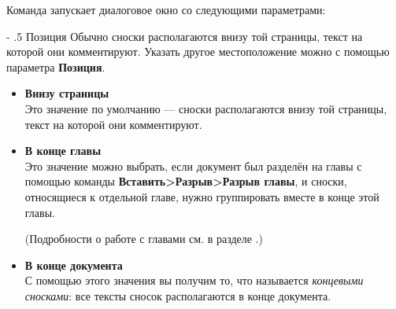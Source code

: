﻿\documentclass[a4paper,10pt]{article}
\makeatletter
\renewcommand\paragraph{%
   \@startsection{paragraph}{4}{0mm}%
      {-\baselineskip}%
      {.5\baselineskip}%
      {\normalfont\normalsize\bfseries}}
\makeatother
\begin{document}
Команда запускает диалоговое окно со следующими параметрами:

\paragraph{Позиция}
Обычно сноски располагаются внизу той страницы, текст на которой они комментируют. Указать другое местоположение можно с помощью параметра \textbf{Позиция}.
\begin{itemize}
 \item \textbf{Внизу страницы}\\
 Это значение по умолчанию — сноски располагаются внизу той страницы, текст на которой они комментируют.
 \item \textbf{В конце главы}\\
 Это значение можно выбрать, если документ был разделён на главы с помощью команды \textbf{Вставить>Разрыв>Разрыв главы}, и сноски, относящиеся к отдельной главе, нужно группировать вместе в конце этой главы.
 
 (Подробности о работе с главами см. в разделе .)
 \item \textbf{В конце документа}\\
 С помощью этого значения вы получим то, что называется \textit{концевыми сносками}: все тексты сносок располагаются в конце документа.
\end{itemize}
\end{document}
